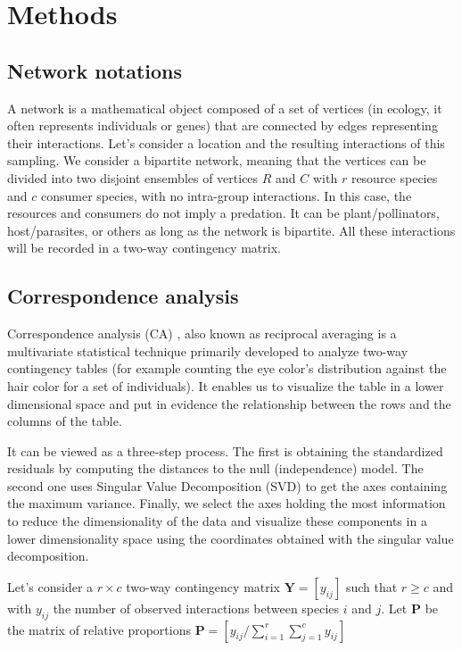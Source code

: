 \section{Methods}

\subsection{Network notations}
A network is a mathematical object composed of a set of vertices (in ecology, it often represents individuals or genes) that are connected by edges representing their interactions.
Let's consider a location and the resulting interactions of this sampling. We consider a bipartite network, meaning that the vertices can be divided into two disjoint ensembles of vertices $R$ and $C$ with $r$ resource species and $c$ consumer species, with no intra-group interactions. In this case, the resources and consumers do not imply a predation. It can be plant/pollinators, host/parasites, or others as long as the network is bipartite.  All these interactions will be recorded in a two-way contingency matrix.



\subsection{Correspondence analysis} {\label{CA}}


Correspondence analysis (CA) \citep{hill_correspondence_1974, beh_simple_2004}, also known as reciprocal averaging is a multivariate statistical technique primarily developed to analyze two-way contingency tables (for example counting the eye color's distribution against the hair color for a set of individuals). It enables us to visualize the table in a lower dimensional space and put in evidence the relationship between the rows and the columns of the table.

It can be viewed as a three-step process. The first is obtaining the standardized residuals by computing the distances to the null (independence) model. The second one uses Singular Value Decomposition (SVD) to get the axes containing the maximum variance. Finally, we select the axes holding the most information to reduce the dimensionality of the data and visualize these components in a lower dimensionality space using the coordinates obtained with the singular value decomposition.


Let's consider a $r \times c$ two-way contingency matrix $\mathbf{Y} = [y_{ij}]$ such that $r\geq c$ and with $y_{ij}$ the number of observed interactions between species $i$ and $j$. Let $\mathbf{P}$ be the matrix of relative proportions $
\mathbf{P} = \left[ y_{ij} / \sum_{i=1}^{r} \sum_{j=1}^{c} y_{ij} \right]
$

